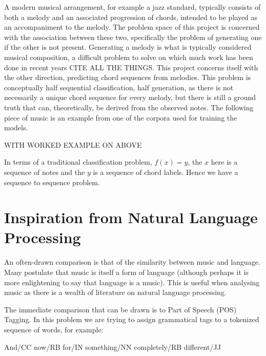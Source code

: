 \documentclass[bsc,singlespacing,logo, parskip, deptreport]{infthesis}
\begin{document}
A modern musical arrangement, for example a jazz standard, typically consists of both a melody and an associated progression of chords, intended to be played as an accompaniment to the melody. The problem space of this project is concerned with the association between these two, specifically the problem of generating one if the other is not present. Generating a melody is what is typically considered musical composition, a difficult problem to solve on which much work has been done in recent years CITE ALL THE THINGS. This project concerns itself with the other direction, predicting chord sequences from melodies. This problem is conceptually half sequential classification, half generation, as there is not necessarily a unique chord sequence for every melody, but there is still a ground truth that can, theoretically, be derived from the observed notes. The following piece of music is an example from one of the corpora used for training the models.



WITH WORKED EXAMPLE ON ABOVE

In terms of a traditional classification problem, $f(x) = y$, the $x$ here is a sequence of notes and the $y$ is a sequence of chord labels. Hence we have a sequence to sequence problem.

\section{Inspiration from Natural Language Processing}

An often-drawn comparison is that of the similarity between music and language. Many postulate that music is itself a form of language \cite{cohen2008music} (although perhaps it is more enlightening to say that language is a music). This is useful when analysing music as there is a wealth of literature on natural language processing.

The immediate comparison that can be drawn is to Part of Speech (POS) Tagging. In this problem we are trying to assign grammatical tags to a tokenized sequence of words, for example:

And/CC now/RB for/IN something/NN completely/RB different/JJ
\end{document}
